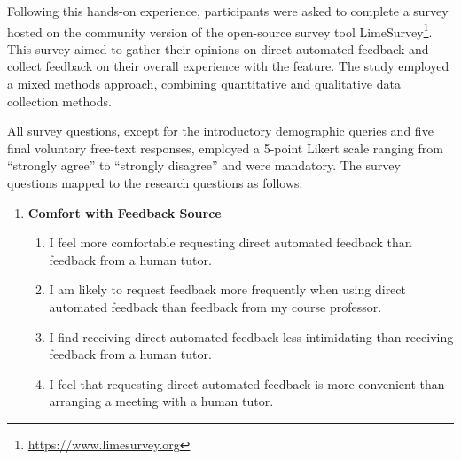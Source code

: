 \documentclass[sigconf,screen,review,anonymous]{acmart}
\begin{document}
Following this hands-on experience, participants were asked to complete a survey hosted on the community version of the open-source survey tool LimeSurvey\footnote{\url{https://www.limesurvey.org}}.
This survey aimed to gather their opinions on direct automated feedback and collect feedback on their overall experience with the feature.
The study employed a mixed methods approach, combining quantitative and qualitative data collection methods.

All survey questions, except for the introductory demographic queries and five final voluntary free-text responses, employed a 5-point Likert scale \cite{allen:2007:LikertScalesData} ranging from ``strongly agree'' to ``strongly disagree'' and were mandatory. 
The survey questions mapped to the research questions as follows:

\begin{enumerate}[label=\textbf{RQ\arabic*}]
  \item \textbf{Comfort with Feedback Source}
  \begin{enumerate}[label=\textbf{Q\arabic*},resume,ref=Q\arabic*, leftmargin=*, itemindent=1.5em]
    \item \label{Q1} I feel more comfortable requesting direct automated feedback than feedback from a human tutor.
    \item \label{Q2} I am likely to request feedback more frequently when using direct automated feedback than feedback from my course professor.
    \item \label{Q3} I find receiving direct automated feedback less intimidating than receiving feedback from a human tutor.
    \item \label{Q4} I feel that requesting direct automated feedback is more convenient than arranging a meeting with a human tutor.

\end{enumerate}
\end{enumerate}
\end{document}
